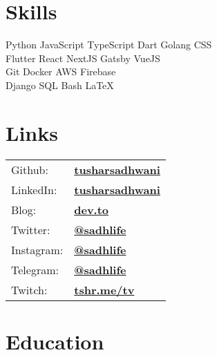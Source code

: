\documentclass[]{resume}
\begin{document}
\begin{minipage}[t]{0.35\textwidth}
\section{Skills}
Python \textbullet{} JavaScript \textbullet{} TypeScript \textbullet{} Dart \textbullet{} Golang \textbullet{} CSS \\
\vspace{8pt}
Flutter \textbullet{} React \textbullet{} NextJS \textbullet{} Gatsby \textbullet{} VueJS \\
\vspace{8pt}
Git \textbullet{} Docker \textbullet{} AWS \textbullet{} Firebase \\
\vspace{8pt}
Django \textbullet{} SQL  \textbullet{} Bash  \textbullet{} \LaTeX \\
\sectionsep


\section{Links}
\begin{tabular}{ll}
Github: & \href{https://github.com/tusharsadhwani}{\bf tusharsadhwani} \\
LinkedIn: & \href{https://www.linkedin.com/in/tusharsadhwani}{\bf tusharsadhwani} \\
Blog: & \href{https://dev.to/tusharsadhwani}{\bf dev.to} \\
Twitter: & \href{https://twitter.com/sadhlife}{\bf @sadhlife} \\
Instagram: & \href{https://instagram.com/sadhlife}{\bf @sadhlife} \\
Telegram: & \href{https://t.me/sadhlife}{\bf @sadhlife} \\
Twitch: & \href{https://tshr.me/tv}{\textbf{tshr.me/tv}} \\
\end{tabular}
\sectionsep
\sectionsep


\section{Education} 


\end{minipage}
\end{document}
